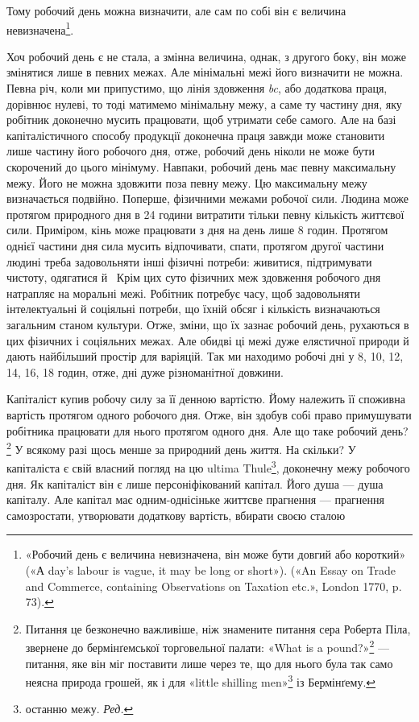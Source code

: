 \parcont{}  %
Тому робочий день можна визначити, але сам по собі він є величина
невизначена\footnote{
«Робочий день є величина невизначена, він може бути довгий або
короткий» («А day’s labour is vague, it may be long or short»). («An
Essay on Trade and Commerce, containing Observations on Taxation etc.»,
London 1770, p. 73).
}.

Хоч робочий день є не стала, а змінна величина, однак, з
другого боку, він може змінятися лише в певних межах. Але мінімальні
межі його визначити не можна. Певна річ, коли ми припустимо,
що лінія здовження \emph{bc}, або додаткова праця, дорівнює
нулеві, то тоді матимемо мінімальну межу, а саме ту частину дня,
яку робітник доконечно мусить працювати, щоб утримати себе
самого. Але на базі капіталістичного способу продукції доконечна
праця завжди може становити лише частину його робочого дня,
отже, робочий день ніколи не може бути скорочений до цього
мінімуму. Навпаки, робочий день має певну максимальну межу.
Його не можна здовжити поза певну межу. Цю максимальну
межу визначається подвійно. Поперше, фізичними межами робочої
сили. Людина може протягом природного дня в 24 години
витратити тільки певну кількість життєвої сили. Приміром, кінь
може працювати з дня на день лише 8 годин. Протягом однієї
частини дня сила мусить відпочивати, спати, протягом другої
частини людині треба задовольняти інші фізичні потреби: живитися,
підтримувати чистоту, одягатися й~ Крім цих суто
фізичних меж здовження робочого дня натрапляє на моральні
межі. Робітник потребує часу, щоб задовольняти інтелектуальні
й соціяльні потреби, що їхній обсяг і кількість визначаються
загальним станом культури. Отже, зміни, що їх зазнає робочий
день, рухаються в цих фізичних і соціяльних межах. Але обидві
ці межі дуже елястичної природи й дають найбільший простір
для варіяцій. Так ми находимо робочі дні у 8, 10, 12, 14, 16, 18
годин, отже, дні дуже різноманітної довжини.

Капіталіст купив робочу силу за її денною вартістю. Йому
належить її споживна вартість протягом одного робочого дня.
Отже, він здобув собі право примушувати робітника працювати
для нього протягом одного дня. Але що таке робочий день?\footnote{
Питання це безконечно важливіше, ніж знамените питання сера
Роберта Піла, звернене до бермінґемської торговельної палати: «What
is a pound?»\footnote*{
Що таке фунт стерлінґів? \emph{Ред.}
} — питання, яке він міг поставити лише через те, що для
нього була так само неясна природа грошей, як і для «little shilling men»\footnote*{
людців від шилінґів. \emph{Ред.}
}
із Бермінґему.
}
У всякому разі щось менше за природний день життя. На
скільки? У капіталіста є свій власний погляд на цю ultima Thule\footnote*{
останню межу. \emph{Ред.}
},
доконечну межу робочого дня. Як капіталіст він є лише персоніфікований
капітал. Його душа — душа капіталу. Але капітал
має одним-однісіньке життєве прагнення — прагнення самозростати,
утворювати додаткову вартість, вбирати своєю сталою
\parbreak{}  %
